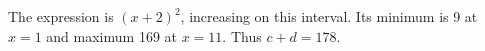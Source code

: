 The expression is $(x+2)^2$, increasing on this interval. Its minimum is 9 at $x=1$ and maximum 169 at $x=11$. Thus $c+d=\boxed{178}$.
